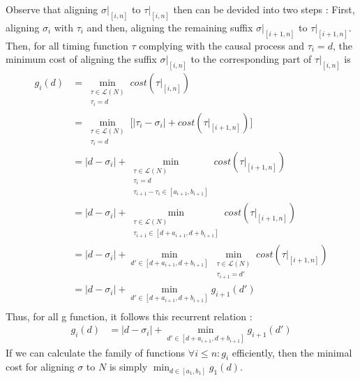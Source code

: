 \documentclass[conference]{IEEEtran}
\begin{document}
Observe that aligning $\sigma|_{[i,n]}$ to $\tau|_{[i,n]}$ then can be devided into two steps : First, aligning $\sigma_i$ with $\tau_i$ and then, aligning the remaining suffix $\sigma|_{[i+1,n]}$ to $\tau|_{[i+1,n]}$. 
Then, for all timing function $\tau$ complying with the causal process and $\tau_i = d$, the minimum cost of aligning the suffix $\sigma|_{[i,n]}$ to the corresponding part of $\tau|_{[i,n]}$ is 
\begin{equation*}
	\begin{split}
		g_i(d) &= \min_{\substack{\tau \in \mathcal{L}(N) \\ \tau_i = d}}cost(\tau|_{[i,n]}) \\
				 	 &= \min_{\substack{\tau \in \mathcal{L}(N) \\ \tau_i = d}}\big[|\tau_i - \sigma_i| + cost(\tau|_{[i+1,n]})\big] \\
					 &= |d - \sigma_i| + \min_{\substack{\tau \in \mathcal{L}(N) \\ \tau_i = d \\ \tau_{i+1} - \tau_i \in [a_{i+1},b_{i+1}]}}cost(\tau|_{[i+1,n]}) \\
					 &= |d - \sigma_i| + \min_{\substack{\tau \in \mathcal{L}(N) \\ \tau_{i+1} \in [d + a_{i+1}, d + b_{i+1}]}}cost(\tau|_{[i+1,n]}) \\
					 &= |d - \sigma_i| + \min_{d' \in [d + a_{i+1}, d + b_{i+1}]} \min_{\substack{\tau \in \mathcal{L}(N) \\ \tau_{i+1} = d'}} cost(\tau|_{[i+1,n]}) \\
					 &= |d - \sigma_i| + \min_{d' \in [d + a_{i+1}, d + b_{i+1}]}g_{i+1}(d') \\
	\end{split}
\end{equation*}
Thus, for all g function, it follows this recurrent relation :
\begin{align*}
g_{i}(d) &= |d - \sigma_{i}| + \min_{d' \in [d+a_{i+1},d+b_{i+1}]} g_{i+1}(d')
\end{align*}
If we can calculate the family of functions $\forall i \leq n : g_i$ efficiently, then the minimal cost for aligning $\sigma$ to $N$ is simply $\min_{d \in [a_1,b_1]} g_1(d)$. 
\end{document}
